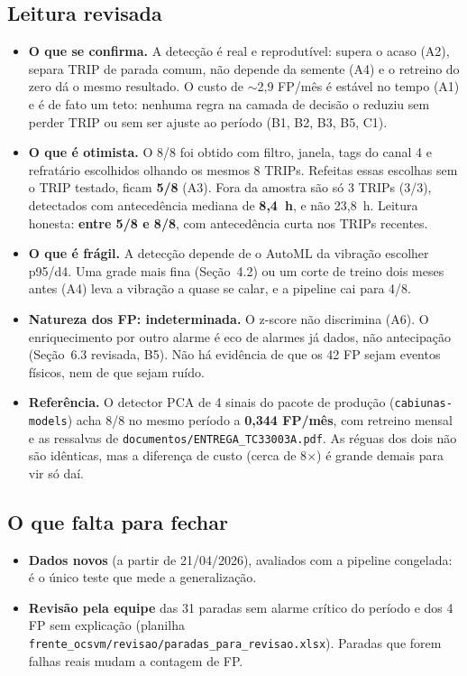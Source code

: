 \documentclass[11pt,a4paper]{article}
\begin{document}
\subsection{Leitura revisada}

\begin{itemize}
  \item \textbf{O que se confirma.} A detecção é real e reprodutível:
    supera o acaso (A2), separa TRIP de parada comum, não depende da
    semente (A4) e o retreino do zero dá o mesmo resultado. O custo de
    $\sim$2,9 FP/mês é estável no tempo (A1) e é de fato um teto: nenhuma
    regra na camada de decisão o reduziu sem perder TRIP ou sem ser
    ajuste ao período (B1, B2, B3, B5, C1).
  \item \textbf{O que é otimista.} O 8/8 foi obtido com filtro, janela,
    tags do canal 4 e refratário escolhidos olhando os mesmos 8 TRIPs.
    Refeitas essas escolhas sem o TRIP testado, ficam \textbf{5/8} (A3).
    Fora da amostra são só 3 TRIPs (3/3), detectados com antecedência
    mediana de \textbf{8,4~h}, e não 23,8~h. Leitura honesta:
    \textbf{entre 5/8 e 8/8}, com antecedência curta nos TRIPs recentes.
  \item \textbf{O que é frágil.} A detecção depende de o AutoML da
    vibração escolher p95/d4. Uma grade mais fina (Seção~4.2) ou um
    corte de treino dois meses antes (A4) leva a vibração a quase se
    calar, e a pipeline cai para 4/8.
  \item \textbf{Natureza dos FP: indeterminada.} O z-score não
    discrimina (A6). O enriquecimento por outro alarme é eco de alarmes
    já dados, não antecipação (Seção~6.3 revisada, B5). Não há evidência
    de que os 42 FP sejam eventos físicos, nem de que sejam ruído.
  \item \textbf{Referência.} O detector PCA de 4 sinais do pacote de
    produção (\texttt{cabiunas-models}) acha 8/8 no mesmo período a
    \textbf{0,344 FP/mês}, com retreino mensal e as ressalvas de
    \texttt{documentos/ENTREGA\_TC33003A.pdf}. As réguas dos dois não
    são idênticas, mas a diferença de custo (cerca de 8$\times$) é grande
    demais para vir só daí.
\end{itemize}

\subsection{O que falta para fechar}

\begin{itemize}
  \item \textbf{Dados novos} (a partir de 21/04/2026), avaliados com a
    pipeline congelada: é o único teste que mede a generalização.
  \item \textbf{Revisão pela equipe} das 31 paradas sem alarme crítico do
    período e dos 4 FP sem explicação (planilha
    \texttt{frente\_ocsvm/revisao/paradas\_para\_revisao.xlsx}). Paradas
    que forem falhas reais mudam a contagem de FP.
\end{itemize}
\end{document}

